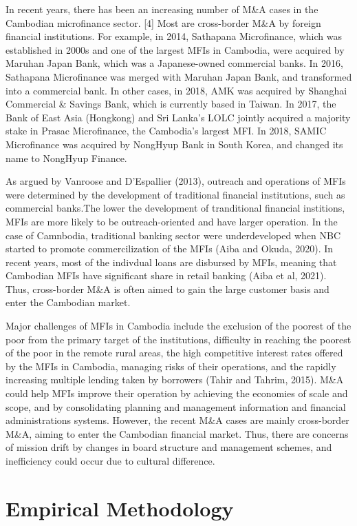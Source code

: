 \documentclass[a4j,12pt]{article}
\begin{document}
In recent years,  there has been an increasing number of M\&A cases in the Cambodian microfinance sector. [4] Most are cross-border M\&A by foreign financial institutions. For example, in 2014, Sathapana Microfinance, which was established in 2000s and one of the largest MFIs in Cambodia, were acquired by Maruhan Japan Bank, which was a Japanese-owned commercial banks. In 2016, Sathapana  Microfinance was merged with Maruhan Japan Bank, and transformed into a commercial bank.  In other cases, in 2018, AMK was acquired by Shanghai Commercial \& Savings Bank, which is currently based in Taiwan. In 2017, the Bank of East Asia (Hongkong) and Sri Lanka’s LOLC  jointly acquired a majority stake in Prasac Microfinance, the Cambodia’s largest MFI. In 2018, SAMIC Microfinance was acquired by NongHyup Bank in South Korea, and changed its name to NongHyup Finance.  

As argued by Vanroose and D'Espallier (2013), outreach and operations of MFIs were determined by the development of traditional financial institutions, such as commercial banks.The lower the development of tranditional financial institions, MFIs are more likely to be outreach-oriented and have larger operation. In the case of Camnbodia, traditional banking sector were underdeveloped when NBC started to promote commercilization of the MFIs (Aiba and Okuda, 2020). In recent years, most of the indivdual loans are disbursed by MFIs, meaning that Cambodian MFIs have significant share in retail banking (Aiba et al, 2021). Thus, cross-border M\&A is often aimed to gain the large customer basis and enter the Cambodian market.  

Major challenges of MFIs in Cambodia include the exclusion of the poorest of the poor from the primary target of the institutions, difficulty in reaching the poorest of the poor in the remote rural areas, the high competitive interest rates offered by the MFIs in Cambodia, managing risks of their operations, and the rapidly increasing multiple lending taken by borrowers (Tahir and Tahrim, 2015). M\&A could help MFIs improve their operation by achieving the economies of scale and scope, and by consolidating planning and management information and financial administrations systems. However, the recent M\&A cases are mainly cross-border M\&A, aiming to enter the Cambodian financial market. Thus, there are concerns of mission drift by changes in board structure and management schemes, and inefficiency could occur due to cultural difference.


\section{Empirical Methodology} 
\end{document}
